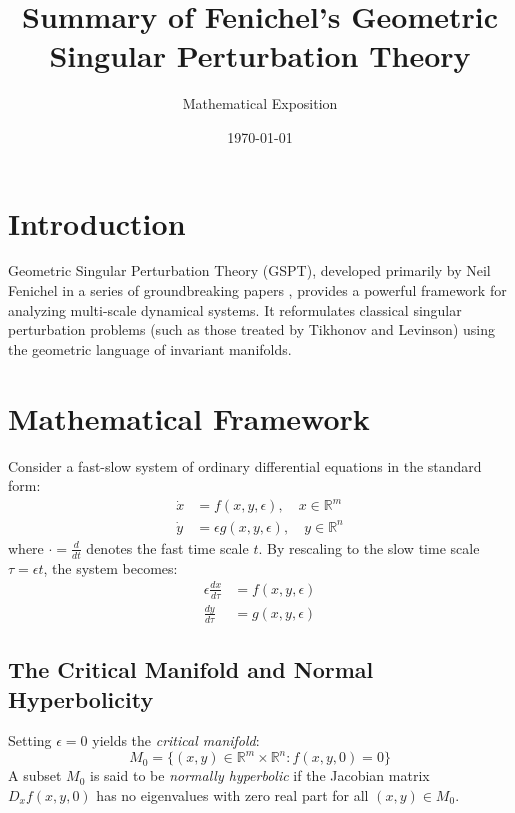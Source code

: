 \documentclass[11pt,a4paper]{article}
\title{Summary of Fenichel's Geometric Singular Perturbation Theory}
\author{Mathematical Exposition}
\date{\today}
\begin{document}
\maketitle

\section{Introduction}
Geometric Singular Perturbation Theory (GSPT), developed primarily by Neil Fenichel in a series of groundbreaking papers \citep{Fenichel1971, Fenichel1974, Fenichel1977, Fenichel1979}, provides a powerful framework for analyzing multi-scale dynamical systems. It reformulates classical singular perturbation problems (such as those treated by Tikhonov and Levinson) using the geometric language of invariant manifolds.

\section{Mathematical Framework}
Consider a fast-slow system of ordinary differential equations in the standard form:
\begin{align}
    \dot{x} &= f(x, y, \epsilon), \quad x \in \mathbb{R}^m \\
    \dot{y} &= \epsilon g(x, y, \epsilon), \quad y \in \mathbb{R}^n
\end{align}
where $\cdot = \frac{d}{dt}$ denotes the fast time scale $t$. By rescaling to the slow time scale $\tau = \epsilon t$, the system becomes:
\begin{align}
    \epsilon \frac{dx}{d\tau} &= f(x, y, \epsilon) \\
    \frac{dy}{d\tau} &= g(x, y, \epsilon)
\end{align}

\subsection{The Critical Manifold and Normal Hyperbolicity}
Setting $\epsilon = 0$ yields the \emph{critical manifold}:
\begin{equation}
    M_0 = \{ (x, y) \in \mathbb{R}^m \times \mathbb{R}^n : f(x, y, 0) = 0 \}
\end{equation}
A subset $M_0$ is said to be \emph{normally hyperbolic} if the Jacobian matrix $D_x f(x, y, 0)$ has no eigenvalues with zero real part for all $(x, y) \in M_0$.
\end{document}
